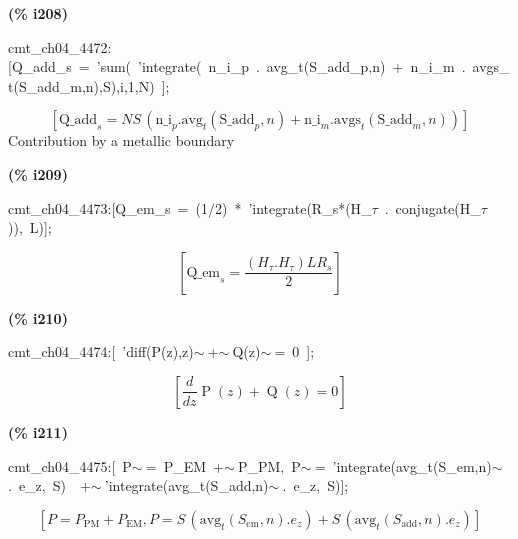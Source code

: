 \documentclass[fleqn]{article}
\begin{document}
\noindent
\begin{minipage}[t]{4.000000em}\color{red}\bfseries
(\% i208)	
\end{minipage}
\begin{minipage}[t]{\textwidth}\color{blue}
cmt\_ch04\_4472:[Q\_add\_s\ =\ 'sum(\ 'integrate(\ n\_i\_p\ .\ avg\_t(S\_add\_p,n)\ +\ n\_i\_m\ .\ avgs\_t(S\_add\_m,n),S),i,1,N)\ ];
\end{minipage}
\[\displaystyle \tag{\% o208} 
\left[ {{\ensuremath{\mathrm{Q\_ add}}}_s}=N S\, \left( {{\ensuremath{\mathrm{n\_ i}}}_p}\ensuremath{\mathrm{ . }}{{\ensuremath{\mathrm{avg}}}_t}\left( {{\ensuremath{\mathrm{S\_ add}}}_p}\operatorname{,}n\right) +{{\ensuremath{\mathrm{n\_ i}}}_m}\ensuremath{\mathrm{ . }}{{\ensuremath{\mathrm{avgs}}}_t}\left( {{\ensuremath{\mathrm{S\_ add}}}_m}\operatorname{,}n\right) \right) \right] \mbox{}
\]
Contribution by a metallic boundary


\noindent
\begin{minipage}[t]{4.000000em}\color{red}\bfseries
(\% i209)	
\end{minipage}
\begin{minipage}[t]{\textwidth}\color{blue}
cmt\_ch04\_4473:[Q\_em\_s\ =\ (1/2)\ *\ 'integrate(R\_s*(H\_\ensuremath{\tau}\ .\ conjugate(H\_\ensuremath{\tau})),\ L)];
\end{minipage}
\[\displaystyle \tag{\% o209} 
\left[ {{\ensuremath{\mathrm{Q\_ em}}}_s}=\frac{\left( {H_{\tau }}\ensuremath{\mathrm{ . }}{H_{\tau }}\right)  L {R_s}}{2}\right] \mbox{}
\]


\noindent
\begin{minipage}[t]{4.000000em}\color{red}\bfseries
(\% i210)	
\end{minipage}
\begin{minipage}[t]{\textwidth}\color{blue}
cmt\_ch04\_4474:[\ 'diff(P(z),z)\ensuremath{\sim\ }+\ensuremath{\sim\ }Q(z)\ensuremath{\sim\ }=\ 0\ ];
\end{minipage}
\[\displaystyle \tag{\% o210} 
\left[ \frac{d}{d z} \operatorname{P}(z)+\operatorname{Q}(z)=0\right] \mbox{}
\]


\noindent
\begin{minipage}[t]{4.000000em}\color{red}\bfseries
(\% i211)	
\end{minipage}
\begin{minipage}[t]{\textwidth}\color{blue}
cmt\_ch04\_4475:[\ P\ensuremath{\sim\ }=\ P\_EM\ +\ensuremath{\sim\ }P\_PM,\ P\ensuremath{\sim\ }=\ 'integrate(avg\_t(S\_em,n)\ensuremath{\sim\ }.\ e\_z,\ S)\ \ +\ensuremath{\sim\ }'integrate(avg\_t(S\_add,n)\ensuremath{\sim\ }.\ e\_z,\ S)];
\end{minipage}
\[\displaystyle \tag{\% o211} 
\left[ P={P_{\ensuremath{\mathrm{PM}}}}+{P_{\ensuremath{\mathrm{EM}}}}\operatorname{,}P=S\, \left( {{\ensuremath{\mathrm{avg}}}_t}\left( {S_{\ensuremath{\mathrm{em}}}}\operatorname{,}n\right) \ensuremath{\mathrm{ . }}{e_z}\right) +S\, \left( {{\ensuremath{\mathrm{avg}}}_t}\left( {S_{\ensuremath{\mathrm{add}}}}\operatorname{,}n\right) \ensuremath{\mathrm{ . }}{e_z}\right) \right] \mbox{}
\]
\end{document}
